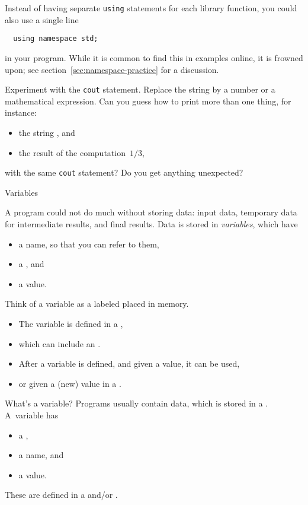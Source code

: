 Instead of having separate \lstinline{using} statements
for each library function,
you could also use a single line
\begin{lstlisting}
  using namespace std;
\end{lstlisting}
in your program.
While it is common to find this in examples online, it is frowned upon;
see section~\ref{sec:namespace-practice} for a discussion.

\begin{exercise}
  \label{ex:cout-what}
  Experiment with the \lstinline{cout} statement. Replace the string by a
  number or a mathematical expression. Can you guess how to print more
  than one thing, for instance:
  \begin{itemize}
  \item the string , and
  \item the result of the computation~$1/3$,     
  \end{itemize}
  with the same \lstinline{cout} statement?
  Do you get anything unexpected?
\end{exercise}

 {Variables}
\label{sec:variables}

A program could not do much without storing data: input data,
temporary data for intermediate results, and final results.
Data is stored in \emph{variables},  which have
\begin{itemize}
\item a name, so that you can refer to them,
\item a , and
\item a value.
\end{itemize}
Think of a variable as a labeled placed in memory.
\begin{itemize}
\item The variable is defined in a
  ,
\item which can include an .
\item After a variable is defined, and given a value, it can be used,
\item or given a (new) value in a .
\end{itemize}

\begin{slide}{What's a variable?}
  \label{sl:declaration}
  Programs usually contain data, which is stored in a
  . A~variable has
  \begin{itemize}
  \item a ,
  \item a name, and
  \item a value.
  \end{itemize}
  These are defined in a  and/or
  .
\end{slide}

